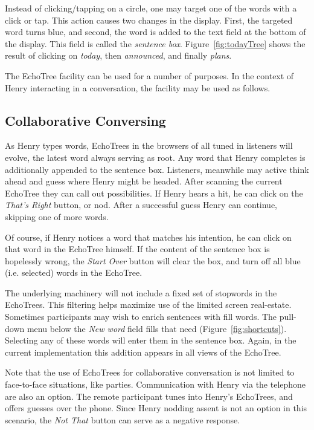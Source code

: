 \documentclass{sigchi}
\begin{document}
Instead of clicking/tapping on a circle, one may target one of the
words with a click or tap. This action causes two changes in the
display. First, the targeted word turns blue, and second, the word is
added to the text field at the bottom of the display. This field is
called the {\em sentence box}. Figure~\ref{fig:todayTree} shows the
result of clicking on {\em today}, then {\em announced}, and finally
{\em plans}.

The EchoTree facility can be used for a number of purposes. In the
context of Henry interacting in a conversation, the facility may be
used as follows. 

\subsection{Collaborative Conversing}

As Henry types words, EchoTrees in the browsers of all tuned in
listeners will evolve, the latest word always serving as root. Any
word that Henry completes is additionally appended to the sentence
box. Listeners, meanwhile may active think ahead and guess where Henry
might be headed. After scanning the current EchoTree they can call out
possibilities. If Henry hears a hit, he can click on the {\em That's
  Right} button, or nod. After a successful guess Henry can continue,
skipping one of more words.

Of course, if Henry notices a word that matches his intention, he can
click on that word in the EchoTree himself. If the content of the
sentence box is hopelessly wrong, the {\em Start Over} button will
clear the box, and turn off all blue (i.e. selected) words in the
EchoTree. 

The underlying machinery will not include a fixed set of stopwords in
the EchoTrees. This filtering helps maximize use of the limited screen
real-estate. Sometimes participants may wish to enrich sentences with
fill words. The pull-down menu below the {\em New word} field fills
that need (Figure~\ref{fig:shortcuts}). Selecting any of these words
will enter them in the sentence box. Again, in the current
implementation this addition appears in all views of the EchoTree. 

Note that the use of EchoTrees for collaborative conversation is not
limited to face-to-face situations, like parties. Communication
with Henry via the telephone are also an option. The remote
participant tunes into Henry's EchoTrees, and offers guesses over the
phone. Since Henry nodding assent is not an option in this scenario,
the {\em Not That} button can serve as a negative response.
\end{document}
